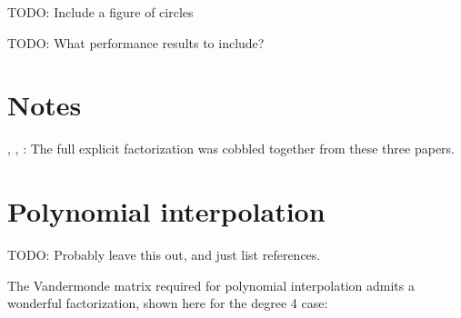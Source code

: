 \documentclass[11pt]{article}
\newcommand{\TODO}{{\color{red} TODO}}
\begin{document}
\TODO: Include a figure of circles

\TODO: What performance results to include?



\appendix

\section{Notes}

\cite{oruc2000explicit}, \cite{olver2006multivariate}, \cite{neidinger2009multivariable}: The full explicit factorization was cobbled together from these three papers.

\section{Polynomial interpolation}

\TODO: Probably leave this out, and just list references.

The Vandermonde matrix required for polynomial interpolation admits a wonderful factorization, shown here for the degree 4 case:
\end{document}
